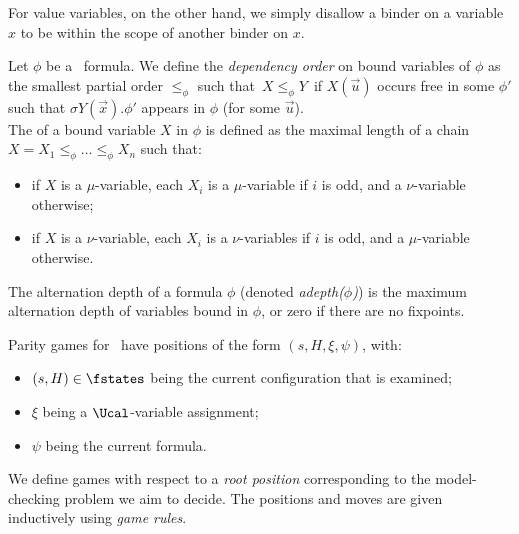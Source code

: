 For value variables, on the other hand, we simply disallow a binder on a variable $x$ to be within the scope of another binder on $x$.

\begin{definition}\label{def:altDepthNom}
    Let $\phi$ be a \fhml\ formula. 
    We define the \emph{dependency order} on bound variables of $\phi$ as the smallest partial order $\leq_\phi$ such that\
    $X \leq_\phi Y$\
    if $X(\vec u)$ occurs free in some $\phi'$ such that $\sigma Y(\vec x) .\phi'$ appears in $\phi$ (for some $\vec u$). 
    \\
    The \boldemph{alternation depth} of a 
    bound variable $X$ in $\phi$ is defined as the maximal length of a chain $X=X_1 \leq_\phi \dots \leq_\phi X_n$ such that:
    \begin{itemize}
        \item if $X$ is a $\mu$-variable, each $X_i$ is a $\mu$-variable if $i$ is odd, and a $\nu$-variable otherwise; 
    \item if $X$ is a $\nu$-variable,  each $X_i$ is a $\nu$-variables if $i$ is odd, and a $\mu$-variable otherwise. 
    \end{itemize}
    The {alternation depth} of a formula $\phi$ (denoted \emph{adepth($\phi$)}) is the maximum alternation depth of variables bound in $\phi$, or zero if there are no fixpoints.
\end{definition}

Parity games for \fhml\ have positions of the form $(s, H, \xi, \psi)$, with:
\begin{itemize}
    \item $(s, H) \in \fstates$ being the current configuration that is examined;
    \item $\xi$ being a $\Ucal$-variable assignment;
    \item $\psi$ being the current formula. 
\end{itemize}
We define games with respect to a \emph{root position} corresponding to the model-checking problem we aim to decide. The positions and moves are given inductively using \emph{game rules}.

